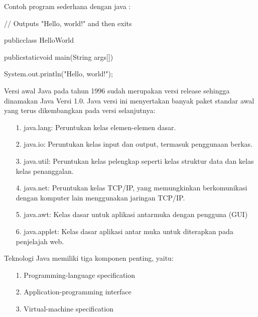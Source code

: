 \documentclass{jtetiproposalskripsi}
\begin{document}
Contoh program sederhana dengan java :

// Outputs "Hello, world!" and then exits

publicclass HelloWorld {

publicstaticvoid main(String args[]){

System.out.println("Hello, world!");
	}
	}

Versi awal Java pada tahun 1996 sudah merupakan versi release sehingga dinamakan Java Versi 1.0. Java versi ini menyertakan banyak paket standar awal yang terus dikembangkan pada versi selanjutnya:
\begin{itemize}

\item[1.]	java.lang: Peruntukan kelas elemen-elemen dasar.
\item[2.]	java.io: Peruntukan kelas input dan output, termasuk penggunaan berkas.
\item[3.]	java.util: Peruntukan kelas pelengkap seperti kelas struktur data dan kelas kelas penanggalan.
\item[4.]	java.net: Peruntukan kelas TCP/IP, yang memungkinkan berkomunikasi dengan komputer lain menggunakan jaringan TCP/IP.
\item[5.]	java.awt: Kelas dasar untuk aplikasi antarmuka dengan pengguna (GUI)
\item[6.]	java.applet: Kelas dasar aplikasi antar muka untuk diterapkan pada penjelajah web.
\end{itemize}

Teknologi Java memiliki tiga komponen penting, yaitu:
\begin{itemize}

\item[1.]	Programming-language specification
\item[2.]	Application-programming interface
\item[3.]	Virtual-machine specification
\end{itemize}
\end{document}
